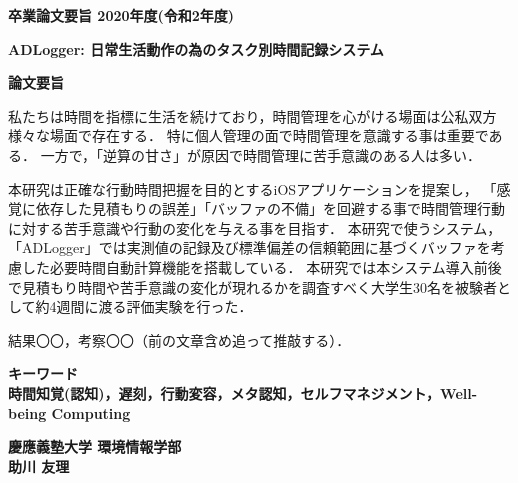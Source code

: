 \begin{center}
\textbf{\Large 卒業論文要旨 2020年度(令和2年度)}

\vspace{6.18mm}

\textbf{\Large ADLogger: 日常生活動作の為のタスク別時間記録システム}
\end{center}

\vspace{10mm}

\begin{flushleft}
\textbf{論文要旨}\\
\end{flushleft}

私たちは時間を指標に生活を続けており，時間管理を心がける場面は公私双方様々な場面で存在する．
特に個人管理の面で時間管理を意識する事は重要である．
一方で，「逆算の甘さ」が原因で時間管理に苦手意識のある人は多い．

本研究は正確な行動時間把握を目的とするiOSアプリケーションを提案し，
「感覚に依存した見積もりの誤差」「バッファの不備」を回避する事で時間管理行動に対する苦手意識や行動の変化を与える事を目指す．
本研究で使うシステム，「ADLogger」では実測値の記録及び標準偏差の信頼範囲に基づくバッファを考慮した必要時間自動計算機能を搭載している．
本研究では本システム導入前後で見積もり時間や苦手意識の変化が現れるかを調査すべく大学生30名を被験者として約4週間に渡る評価実験を行った．

結果〇〇，考察〇〇（前の文章含め追って推敲する）．

\begin{flushleft}
\textbf{キーワード}\\
\textbf{時間知覚(認知)，遅刻，行動変容，メタ認知，セルフマネジメント，Well-being Computing}

\end{flushleft}

\begin{flushright}
\textbf{慶應義塾大学 環境情報学部}\\
\textbf{助川 友理}
\end{flushright}
\newpage

